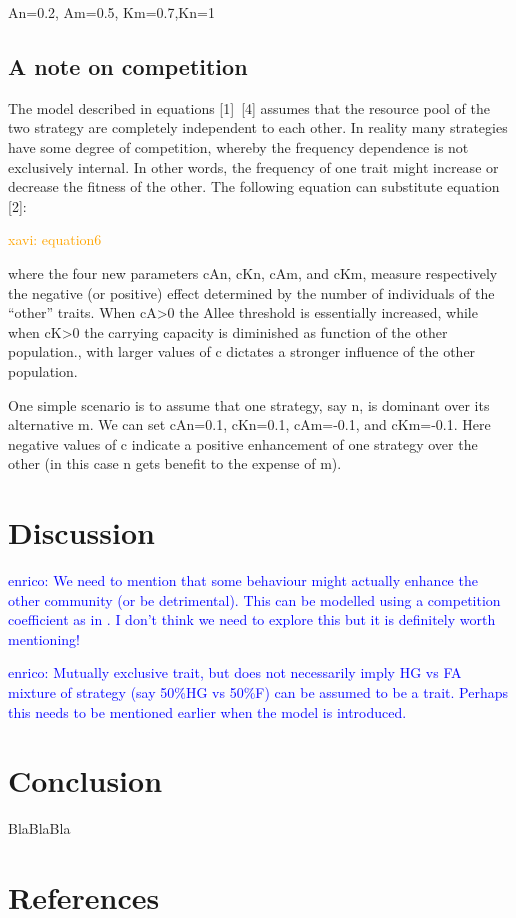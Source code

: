\documentclass[preprint,authoryear]{elsarticle}
\newcommand{\memo}[2]{\textcolor{#1}{#2}}
\newcommand{\xavi}[1]{\memo{orange}{xavi: #1\\}}
\newcommand{\enrico}[1]{\memo{blue}{enrico: #1\\}}
\begin{document}
An=0.2, Am=0.5, Km=0.7,Kn=1

\subsection{A note on competition}

The model described in equations [1]~[4] assumes that the resource pool of the two strategy are completely independent to each other. In reality many strategies have some degree of competition, whereby the frequency dependence is not exclusively internal. In other words, the frequency of one  trait might increase or decrease the fitness of the other. The following equation can substitute equation [2]: 

\xavi{equation6}

where the four new parameters cAn, cKn, cAm, and cKm, measure respectively the negative (or positive) effect determined by the number of individuals of the “other” traits. When cA>0 the Allee threshold is essentially increased, while when cK>0 the carrying capacity is diminished as function of the other population., with larger values of c dictates a stronger influence of the other population. 

One simple scenario is to assume that one strategy, say n, is dominant over its alternative m. We can  set cAn=0.1,  cKn=0.1,  cAm=-0.1, and  cKm=-0.1. Here negative values of c indicate a positive enhancement of one strategy over the other (in this case n gets benefit to the expense of m). 

\section{Discussion}

\enrico{We need to mention that some behaviour might actually enhance the other community (or be detrimental). This can be modelled using a competition coefficient as in \citep{jang2013}. I don't think we need to explore this but it is definitely worth mentioning!}

\enrico{Mutually exclusive trait, but does not necessarily imply HG vs FA mixture of strategy (say 50\%HG vs 50\%F) can be assumed to be a trait. Perhaps this needs to be mentioned earlier when the model is introduced.}

\section{Conclusion}

BlaBlaBla

\section{References}



\end{document}

